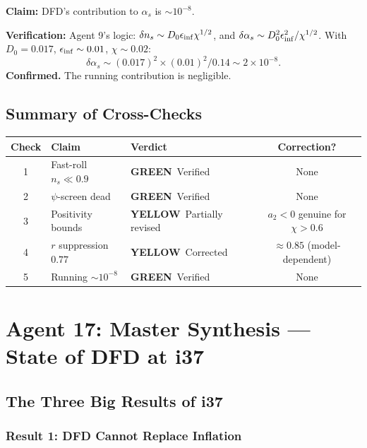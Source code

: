 \documentclass[11pt,a4paper]{article}
\newcommand{\GREEN}{\textcolor{dfdgreen}{\textbf{GREEN}}}
\newcommand{\YELLOW}{\textcolor{dfdyellow}{\textbf{YELLOW}}}
\begin{document}
\textbf{Claim:} DFD's contribution to $\alpha_s$ is $\sim 10^{-8}$.

\textbf{Verification:} Agent 9's logic: $\delta n_s \sim D_0 \epsilon_{\rm inf} \chi^{1/2}$, and $\delta\alpha_s \sim D_0^2\epsilon_{\rm inf}^2/\chi^{1/2}$. With $D_0 = 0.017$, $\epsilon_{\rm inf} \sim 0.01$, $\chi \sim 0.02$:
\begin{equation}
\delta\alpha_s \sim (0.017)^2 \times (0.01)^2 / 0.14 \sim 2 \times 10^{-8}.
\end{equation}
\textbf{Confirmed.} The running contribution is negligible.

\subsection{Summary of Cross-Checks}

\begin{center}
\begin{tabular}{cllc}
\toprule
\textbf{Check} & \textbf{Claim} & \textbf{Verdict} & \textbf{Correction?} \\
\midrule
1 & Fast-roll $n_s \ll 0.9$ & \GREEN\ Verified & None \\
2 & $\psi$-screen dead & \GREEN\ Verified & None \\
3 & Positivity bounds & \YELLOW\ Partially revised & $a_2 < 0$ genuine for $\chi > 0.6$ \\
4 & $r$ suppression $0.77$ & \YELLOW\ Corrected & $\approx 0.85$ (model-dependent) \\
5 & Running $\sim 10^{-8}$ & \GREEN\ Verified & None \\
\bottomrule
\end{tabular}
\end{center}

\newpage
\section{Agent 17: Master Synthesis --- State of DFD at i37}
\label{sec:agent17}

\subsection{The Three Big Results of i37}

\subsubsection{Result 1: DFD Cannot Replace Inflation}
\end{document}
